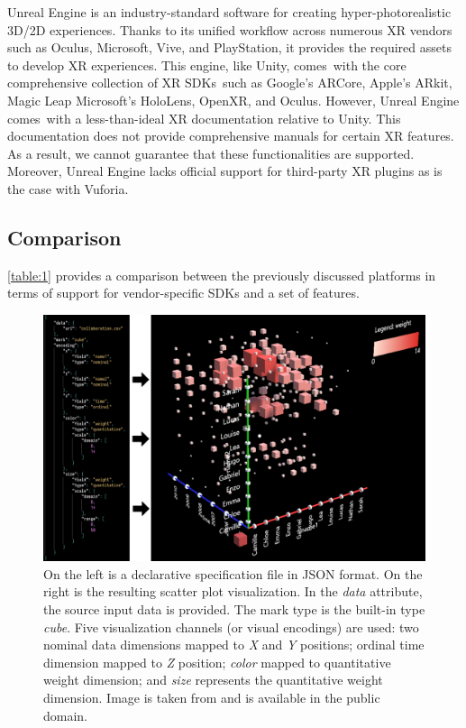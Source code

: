 \documentclass{vgtc}                          %
\begin{document}
Unreal Engine is an industry-standard software for creating hyper-photorealistic 3D/2D experiences. Thanks to its unified workflow across
numerous XR vendors such as Oculus, Microsoft, Vive, and PlayStation, it provides the required assets
to develop XR experiences. This engine, like Unity, comes with the core comprehensive collection of XR SDKs such as Google's
ARCore, Apple's ARkit, Magic Leap Microsoft's HoloLens, OpenXR, and Oculus.
However, Unreal Engine comes with a  less-than-ideal XR documentation relative
to Unity. This documentation does not provide comprehensive manuals for certain
XR features. As a result, we cannot guarantee that these functionalities are
supported. Moreover, Unreal Engine lacks official support for third-party XR
plugins as is the case with Vuforia.
\subsection{Comparison}
\autoref{table:1} provides a comparison between the previously discussed
platforms in terms of support for vendor-specific SDKs and a set of features.

\begin{figure}[t!]
	\centering
	\includegraphics[width=\columnwidth]{dxr_toolkit_00}
    \caption{On the left is a declarative specification file in JSON format. On the right is the resulting
    scatter plot visualization. In the \textit{data} attribute, the source input data is provided. The mark
    type is the built-in type \textit{cube}. Five visualization channels (or visual encodings) are used:
    two nominal data dimensions mapped to \textit{X} and \textit{Y} positions; ordinal time dimension mapped
    to \textit{Z} position; \textit{color} mapped to quantitative weight dimension; and \textit{size}
    represents the quantitative weight dimension.
    Image is taken from \cite{dxr:repo} and is available in the public domain.}
    \label{fig:dxr_toolkit_00}
\end{figure}
\end{document}
